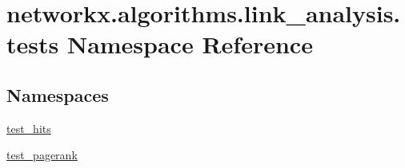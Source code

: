\hypertarget{namespacenetworkx_1_1algorithms_1_1link__analysis_1_1tests}{}\section{networkx.\+algorithms.\+link\+\_\+analysis.\+tests Namespace Reference}
\label{namespacenetworkx_1_1algorithms_1_1link__analysis_1_1tests}
\subsection*{Namespaces}
\begin{DoxyCompactItemize}
\item 
 \hyperlink{namespacenetworkx_1_1algorithms_1_1link__analysis_1_1tests_1_1test__hits}{test\+\_\+hits}
\item 
 \hyperlink{namespacenetworkx_1_1algorithms_1_1link__analysis_1_1tests_1_1test__pagerank}{test\+\_\+pagerank}
\end{DoxyCompactItemize}
